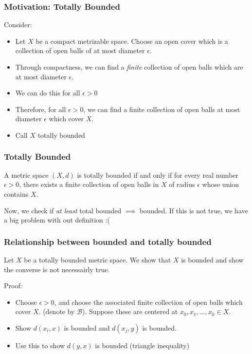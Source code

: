 \documentclass[compress, red]{beamer}
\begin{document}
    \begin{frame}
        \frametitle{Motivation: Totally Bounded}
        Consider:
        \begin{itemize}
            \item<2-> Let $X$ be a compact metrizable space. Choose an open cover which is a collection of open balls of at most diameter $\epsilon$.
            \item<3-> Through compactness, we can find a \textit{finite} collection of open balls which are at most diameter $\epsilon$.
            \item<4-> We can do this for all $\epsilon>0$
            \item<5-> Therefore, for all $\epsilon>0$, we can find a finite collection of open balls at most diameter $\epsilon$ which cover $X$.
            \item<6-> Call $X$ \alert{totally bounded}
        \end{itemize}
    \end{frame}

    \begin{frame}
        \frametitle{Totally Bounded}
        \begin{definition}
            A metric space $(X,d)$ is \alert{totally bounded} if and only if for every real number $\epsilon>0$, there exists a finite collection of
            open balls in $X$ of radius $\epsilon$ whose union contains $X$.
        \end{definition}
        Now, we check if \textit{at least} total bounded $\implies$ bounded. If this is not true, we have a big problem with out definition :(
    \end{frame}

    \begin{frame}
        \frametitle{Relationship between bounded and totally bounded}
        \begin{theorem}
            Let $X$ be a totally bounded metric space. We show that $X$ is bounded and show the converse is not necessairly true.
        \end{theorem}
        Proof:
        \begin{itemize}
            \item<2-> Choose $\epsilon>0$, and choose the associated finite collection of open balls which cover $X$. (denote by $\mathcal{B}$).
                Suppose these are centered at $x_0,x_1,\hdots,x_k\in X$.
            \item<3-> Show $d(x_i,x)$ is bounded and $d(x_j,y)$ is bounded.
            \item<4-> Use this to show $d(y,x)$ is bounded (triangle inequality)
        \end{itemize}
    \end{frame}
\end{document}
